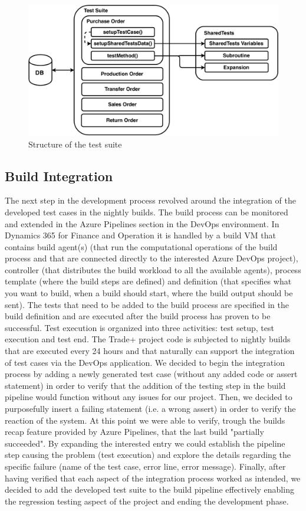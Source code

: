 \begin{figure}[ht]
	\centering
	\includegraphics[scale=0.6]{Images/TestSuite.pdf}
	\caption{Structure of the test suite}
	\label{fig:TestSuite}
\end{figure}

\subsection{Build Integration}

The next step in the development process revolved around the integration of the developed test cases in the nightly builds. The build process can be monitored and extended in the Azure Pipelines section in the DevOps environment. In Dynamics 365 for Finance and Operation it is handled by a build VM that contains build agent(s) (that run the computational operations of the build process and that are connected directly to the interested Azure DevOps project), controller (that distributes the build workload to all the available agents), process template (where the build steps are defined) and definition (that specifies what you want to build, when a build should start, where the build output should be sent). The tests that need to be added to the build process are specified in the build definition and are executed after the build process has proven to be successful. Test execution is organized into three activities: test setup, test execution and test end. The Trade+ project code is subjected to nightly builds that are executed every 24 hours and that naturally can support the integration of test cases via the DevOps application. We decided to begin the integration process by adding a newly generated test case (without any added code or assert statement) in order to verify that the addition of the testing step in the build pipeline would function without any issues for our project. Then, we decided to purposefully insert a failing statement (i.e. a wrong assert) in order to verify the reaction of the system. At this point we were able to verify, trough the builds recap feature provided by Azure Pipelines, that the last build "partially succeeded". By expanding the interested entry we could establish the pipeline step causing the problem (test execution) and explore the details regarding the specific failure (name of the test case, error line, error message). Finally, after having verified that each aspect of the integration process worked as intended, we decided to add the developed test suite to the build pipeline effectively enabling the regression testing aspect of the project and ending the development phase.

